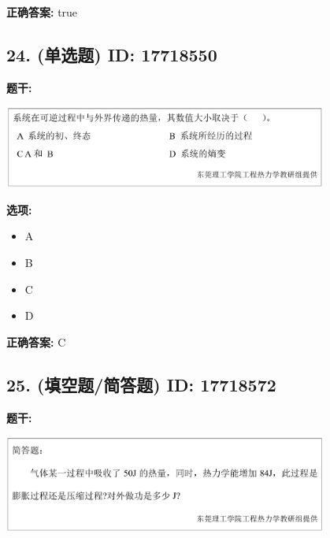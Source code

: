 \documentclass[12pt]{article}
\begin{document}
\textbf{正确答案:}
true

\vspace{0.5em}\hrulefill\vspace{1em}

\subsection*{24. (单选题) \small ID: 17718550}

\textbf{题干:}


\begin{center}\includegraphics[width=0.8\textwidth, height=0.25\textheight, keepaspectratio]{question_24_17718550/title_img_1.png}\end{center}

\textbf{选项:}
\begin{itemize}[leftmargin=*]
  \item A

  \item B

  \item C

  \item D

\end{itemize}

\textbf{正确答案:}
C

\vspace{0.5em}\hrulefill\vspace{1em}

\subsection*{25. (填空题/简答题) \small ID: 17718572}

\textbf{题干:}


\begin{center}\includegraphics[width=0.8\textwidth, height=0.25\textheight, keepaspectratio]{question_25_17718572/title_img_1.png}\end{center}
\end{document}
